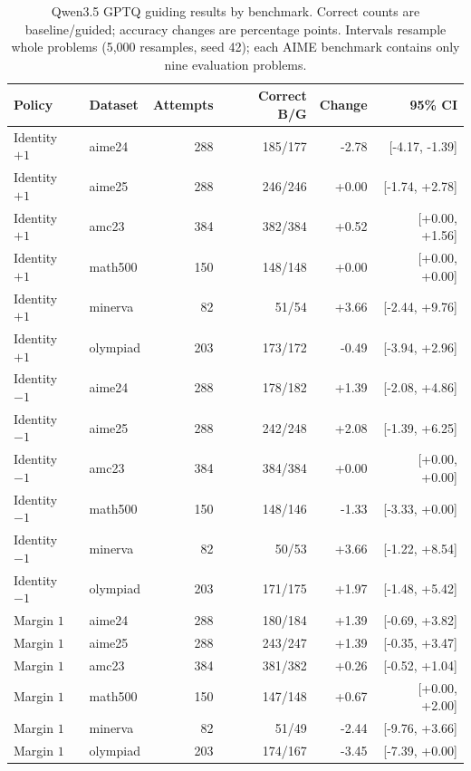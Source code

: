 \begin{table}[ht]
\centering\small
\caption{Qwen3.5 GPTQ guiding results by benchmark. Correct counts are baseline/guided; accuracy changes are percentage points. Intervals resample whole problems (5,000 resamples, seed 42); each AIME benchmark contains only nine evaluation problems.}
\label{tab:guiding-datasets}
\begin{tabular}{llrrrr}
\toprule
Policy & Dataset & Attempts & Correct B/G & Change & 95\% CI \\
\midrule
Identity $+1$ & aime24 & 288 & 185/177 & -2.78 & [-4.17, -1.39] \\
Identity $+1$ & aime25 & 288 & 246/246 & +0.00 & [-1.74, +2.78] \\
Identity $+1$ & amc23 & 384 & 382/384 & +0.52 & [+0.00, +1.56] \\
Identity $+1$ & math500 & 150 & 148/148 & +0.00 & [+0.00, +0.00] \\
Identity $+1$ & minerva & 82 & 51/54 & +3.66 & [-2.44, +9.76] \\
Identity $+1$ & olympiad & 203 & 173/172 & -0.49 & [-3.94, +2.96] \\
Identity $-1$ & aime24 & 288 & 178/182 & +1.39 & [-2.08, +4.86] \\
Identity $-1$ & aime25 & 288 & 242/248 & +2.08 & [-1.39, +6.25] \\
Identity $-1$ & amc23 & 384 & 384/384 & +0.00 & [+0.00, +0.00] \\
Identity $-1$ & math500 & 150 & 148/146 & -1.33 & [-3.33, +0.00] \\
Identity $-1$ & minerva & 82 & 50/53 & +3.66 & [-1.22, +8.54] \\
Identity $-1$ & olympiad & 203 & 171/175 & +1.97 & [-1.48, +5.42] \\
Margin $1$ & aime24 & 288 & 180/184 & +1.39 & [-0.69, +3.82] \\
Margin $1$ & aime25 & 288 & 243/247 & +1.39 & [-0.35, +3.47] \\
Margin $1$ & amc23 & 384 & 381/382 & +0.26 & [-0.52, +1.04] \\
Margin $1$ & math500 & 150 & 147/148 & +0.67 & [+0.00, +2.00] \\
Margin $1$ & minerva & 82 & 51/49 & -2.44 & [-9.76, +3.66] \\
Margin $1$ & olympiad & 203 & 174/167 & -3.45 & [-7.39, +0.00] \\
\bottomrule
\end{tabular}
\end{table}
